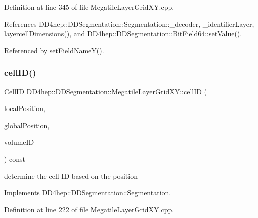 Definition at line 345 of file Megatile\+Layer\+Grid\+X\+Y.\+cpp.



References D\+D4hep\+::\+D\+D\+Segmentation\+::\+Segmentation\+::\+\_\+decoder, \+\_\+identifier\+Layer, layercell\+Dimensions(), and D\+D4hep\+::\+D\+D\+Segmentation\+::\+Bit\+Field64\+::set\+Value().



Referenced by set\+Field\+Name\+Y().

\hypertarget{class_d_d4hep_1_1_d_d_segmentation_1_1_megatile_layer_grid_x_y_a594269129ed71d3dbb0b9da7181fa58a}{}\label{class_d_d4hep_1_1_d_d_segmentation_1_1_megatile_layer_grid_x_y_a594269129ed71d3dbb0b9da7181fa58a} 
\subsubsection{\texorpdfstring{cell\+I\+D()}{cellID()}}
{\footnotesize\ttfamily \hyperlink{namespace_d_d4hep_1_1_d_d_segmentation_ac7af071d85cb48820914434a07e21ba1}{Cell\+ID} D\+D4hep\+::\+D\+D\+Segmentation\+::\+Megatile\+Layer\+Grid\+X\+Y\+::cell\+ID (\begin{DoxyParamCaption}\item[{const \hyperlink{struct_d_d4hep_1_1_d_d_segmentation_1_1_vector3_d}{Vector3D} \&}]{local\+Position,  }\item[{const \hyperlink{struct_d_d4hep_1_1_d_d_segmentation_1_1_vector3_d}{Vector3D} \&}]{global\+Position,  }\item[{const \hyperlink{namespace_d_d4hep_1_1_d_d_segmentation_a61a6833a18d1800bdef176595f83e3ba}{Volume\+ID} \&}]{volume\+ID }\end{DoxyParamCaption}) const\hspace{0.3cm}{\ttfamily [virtual]}}



determine the cell ID based on the position 



Implements \hyperlink{class_d_d4hep_1_1_d_d_segmentation_1_1_segmentation_ad5a60953d96d409850d8192f64f8ce3c}{D\+D4hep\+::\+D\+D\+Segmentation\+::\+Segmentation}.



Definition at line 222 of file Megatile\+Layer\+Grid\+X\+Y.\+cpp.



